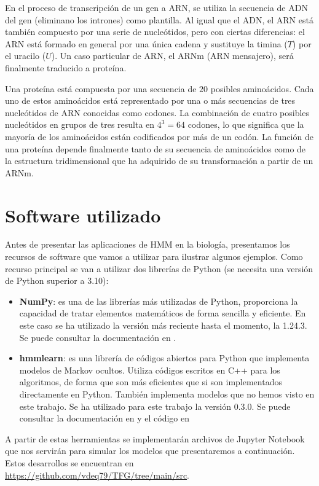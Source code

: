 En el proceso de transcripción de un gen a ARN, se utiliza la secuencia de ADN del gen (eliminano los intrones) como plantilla. Al igual que el ADN, el ARN está también compuesto por una serie de nucleótidos, pero con ciertas diferencias: el ARN está formado en general por una única cadena y sustituye la timina ($T$) por el uracilo ($U$). Un caso particular de ARN, el ARNm (ARN mensajero), será finalmente traducido a proteína.

Una proteína está compuesta por una secuencia de $20$ posibles aminoácidos. Cada uno de estos aminoácidos está representado por una o más secuencias de tres nucleótidos de ARN conocidas como codones. La combinación de cuatro posibles nucleótidos en grupos de tres resulta en $4^3=64$ codones, lo que significa que la mayoría de los aminoácidos están codificados por más de un codón. La función de una proteína depende finalmente tanto de su secuencia de aminoácidos como de la estructura tridimensional que ha adquirido de su transformación a partir de un ARNm. 

\section{Software utilizado}
Antes de presentar las aplicaciones de HMM en la biología, presentamos los recursos de software que vamos a utilizar para ilustrar algunos ejemplos. Como recurso principal se van a utilizar dos librerías de Python (se necesita una versión de Python superior a 3.10):
\begin{itemize}
    \item \textbf{NumPy}: es una de las librerías más utilizadas de Python, proporciona la capacidad de tratar elementos matemáticos de forma sencilla y eficiente. En este caso se ha utilizado la versión más reciente hasta el momento, la 1.24.3. Se puede consultar la documentación en \cite{numpy}.
    \item \textbf{hmmlearn}: es una librería de códigos abiertos para Python que implementa modelos de Markov ocultos. Utiliza códigos escritos en C++ para los algoritmos, de forma que son más eficientes que si son implementados directamente en Python. También implementa modelos que no hemos visto en este trabajo. Se ha utilizado para este trabajo la versión 0.3.0. Se puede consultar la documentación en \cite{hmmlearn} y el código en \cite{hmmlearnGithub}
\end{itemize}
A partir de estas herramientas se implementarán archivos de Jupyter Notebook que nos servirán para simular los modelos que presentaremos a continuación. Estos desarrollos se encuentran en \url{https://github.com/vdeq79/TFG/tree/main/src}.

